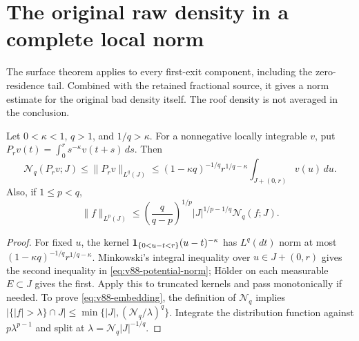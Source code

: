\section{The original raw density in a complete local norm}
\label{sec:v88-raw}
The surface theorem applies to every first-exit component, including
the zero-residence tail. Combined with the retained fractional source,
it gives a norm estimate for the original bad density itself. The
roof density is not averaged in the conclusion.

\begin{lemma}
\label{lem:v88-potential-norm}
Let $0<\kappa<1$, $q>1$, and $1/q>\kappa$. For a nonnegative
locally integrable $v$, put $P_rv(t)=\int_0^r s^{-\kappa}v(t+s)\,ds$.
Then
\begin{equation}\label{eq:v88-potential-norm}
 \mathcal N_q(P_rv;J)\le\|P_rv\|_{L^q(J)}
 \le (1-\kappa q)^{-1/q}r^{1/q-\kappa}
                                    \int_{J+(0,r)}v(u)\,du.
\end{equation}
Also, if $1\le p<q$,
\begin{equation}\label{eq:v88-embedding}
 \|f\|_{L^p(J)}\le
   \left(\frac q{q-p}\right)^{1/p}
         |J|^{1/p-1/q}\mathcal N_q(f;J).
\end{equation}
\end{lemma}
\begin{proof}
For fixed $u$, the kernel $\mathbf1_{\{0<u-t<r\}}(u-t)^{-\kappa}$
has $L^q(dt)$ norm at most
$(1-\kappa q)^{-1/q}r^{1/q-\kappa}$. Minkowski's integral
inequality over $u\in J+(0,r)$ gives the second inequality in
\eqref{eq:v88-potential-norm}; H\"older on each measurable $E\subset J$
gives the first. Apply this to truncated kernels and pass monotonically
if needed. To prove \eqref{eq:v88-embedding}, the definition of
$\mathcal N_q$ implies
$|\{|f|>\lambda\}\cap J|\le\min\{|J|,(\mathcal N_q/\lambda)^q\}$.
Integrate the distribution function against $p\lambda^{p-1}$ and
split at $\lambda=\mathcal N_q|J|^{-1/q}$.
\end{proof}


